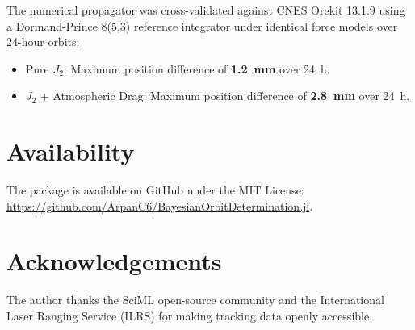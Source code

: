 \documentclass[11pt,a4paper]{article}
\begin{document}
The numerical propagator was cross-validated against CNES Orekit 13.1.9 using a Dormand-Prince 8(5,3) reference integrator under identical force models over 24-hour orbits:
\begin{itemize}
    \item Pure $J_2$: Maximum position difference of \textbf{1.2~mm} over 24~h.
    \item $J_2$ + Atmospheric Drag: Maximum position difference of \textbf{2.8~mm} over 24~h.
\end{itemize}

\section{Availability}

The package is available on GitHub under the MIT License: \\
\url{https://github.com/ArpanC6/BayesianOrbitDetermination.jl}.

\section*{Acknowledgements}
The author thanks the SciML open-source community and the International Laser Ranging Service (ILRS) for making tracking data openly accessible.
\end{document}
